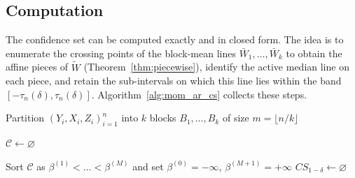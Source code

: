 \subsection{Computation}

The confidence set can be computed exactly and in closed form. The idea is to enumerate the crossing points of the block-mean lines $\bar{W}_1,\dots,\bar{W}_k$ to obtain the affine pieces of $\widetilde{W}$ (Theorem~\ref{thm:piecewise}), identify the active median line on each piece, and retain the sub-intervals on which this line lies within the band $[-\tau_n(\delta),\tau_n(\delta)]$. Algorithm~\ref{alg:mom_ar_cs} collects these steps.



\begin{algorithm}[!htbp]
\caption{MoM-AR Confidence Set}
\label{alg:mom_ar_cs}

Partition $(Y_i,X_i,Z_i)_{i=1}^{n}$ into $k$ blocks $B_1,\dots,B_k$ of size $m=\lfloor n/k\rfloor$\;

$\mathcal{C}\leftarrow\varnothing$\;


Sort $\mathcal{C}$ as $\beta^{(1)}<\dots<\beta^{(M)}$ and set $\beta^{(0)}=-\infty$, $\beta^{(M+1)}=+\infty$\; $CS_{1-\delta}\leftarrow\varnothing$\;

\;
\end{algorithm}



